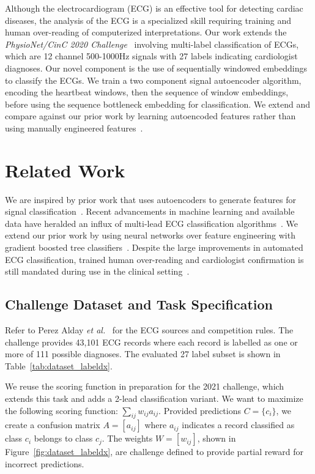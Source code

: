 \documentclass[\main/thesis.tex]{subfiles}
\begin{document}
Although the electrocardiogram (ECG) is an effective tool for detecting cardiac diseases, the analysis of the ECG is a specialized skill requiring training and human over-reading of computerized interpretations.
Our work extends the \emph{PhysioNet/CinC 2020 Challenge}~\cite{physionet_challenge_2020} involving multi-label classification of ECGs, which are 12 channel 500-1000Hz signals with 27 labels indicating cardiologist diagnoses.
Our novel component is the use of sequentially windowed embeddings to classify the ECGs.
We train a two component signal autoencoder algorithm, encoding the heartbeat windows, then the sequence of window embeddings, before using the sequence bottleneck embedding for classification.
We extend and compare against our prior work by learning autoencoded features rather than using manually engineered features~\cite{wong2020CINC-multilabel-ECG}.

\section{Related Work}

We are inspired by prior work that uses autoencoders to generate features for signal classification~\cite{8688435,7752836}.
Recent advancements in machine learning and available data have heralded an influx of multi-lead ECG classification algorithms~\cite{ribeiro2020,CHEN2020100886,9206538,BALOGLU201923,8846016,wong2020CINC-multilabel-ECG}.
We extend our prior work by using neural networks over feature engineering with gradient boosted tree classifiers~\cite{wong2020CINC-multilabel-ECG}.
Despite the large improvements in automated ECG classification, trained human over-reading and cardiologist confirmation is still mandated during use in the clinical setting~\cite{SMITH201988,MADIAS2018413}.

\subsection{Challenge Dataset and Task Specification}
Refer to Perez Alday \emph{et al.}~\cite{physionet_challenge_2020} for the ECG sources and competition rules.
The challenge provides 43,101 ECG records where each record is labelled as one or more of 111 possible diagnoses.
The evaluated 27 label subset is shown in Table~\ref{tab:dataset_labeldx}.

We reuse the scoring function in preparation for the 2021 challenge, which extends this task and adds a 2-lead classification variant.
We want to maximize the following scoring function: $\sum_{ij} w_{ij} a_{ij}$.
Provided predictions $C = \{c_i\}$, we create a confusion matrix $A = [a_{ij}]$ where $a_{ij}$ indicates a record classified as class $c_i$ belongs to class $c_j$.
The weights $W = [w_{ij}]$, shown in Figure~\ref{fig:dataset_labeldx}, are challenge defined to provide partial reward for incorrect predictions.
\end{document}
